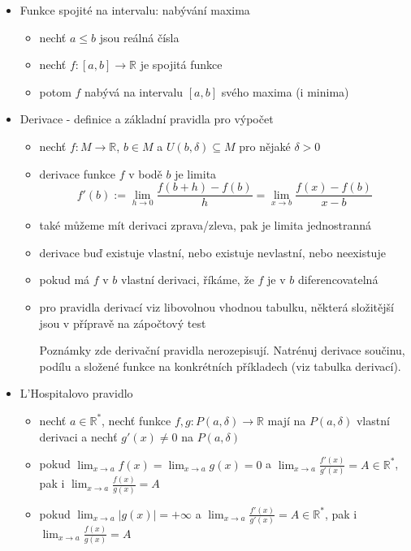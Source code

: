 \begin{itemize}
\begin{itemize}
\item pak každé reálné číslo z intervalu $[m,M]$ je hodnotou funkce $f$ (pro každé $y\in[m,M]$ existuje $x\in[a,b]$ takové, že $f(x)=y$)
\end{itemize}
\item Funkce spojité na intervalu: nabývání maxima
\begin{itemize}
\item nechť $a\leq b$ jsou reálná čísla
\item nechť $f:[a,b]\to\mathbb R$ je spojitá funkce
\item potom $f$ nabývá na intervalu $[a,b]$ svého maxima (i minima)
\end{itemize}
\item Derivace - definice a základní pravidla pro výpočet
\begin{itemize}
\item nechť $f:M\to\mathbb R$, $b\in M$ a $U(b,\delta)\subseteq M$ pro nějaké $\delta\gt 0$
\item derivace funkce $f$ v bodě $b$ je limita \[f'(b):=\lim_{h\to 0}\frac{f(b+h)-f(b)}{h}=\lim_{x\to b}\frac{f(x)-f(b)}{x-b}\]
\item také můžeme mít derivaci zprava/zleva, pak je limita jednostranná
\item derivace buď existuje vlastní, nebo existuje nevlastní, nebo neexistuje
\item pokud má $f$ v $b$ vlastní derivaci, říkáme, že $f$ je v $b$ diferencovatelná
\item pro pravidla derivací viz libovolnou vhodnou tabulku, některá složitější jsou v přípravě na zápočtový test
\begin{practicebox}
Poznámky zde derivační pravidla nerozepisují. Natrénuj derivace součinu, podílu a složené funkce na konkrétních příkladech (viz tabulka derivací).
\end{practicebox}
\end{itemize}
\item L'Hospitalovo pravidlo
\begin{itemize}
\item nechť $a\in\mathbb R^*$, nechť funkce $f,g:P(a,\delta)\to\mathbb R$ mají na $P(a,\delta)$ vlastní derivaci a nechť $g'(x)\neq 0$ na $P(a,\delta)$
\item pokud $\lim_{x\to a}f(x)=\lim_{x\to a}g(x)=0$ a $\lim_{x\to a}\frac{f'(x)}{g'(x)}=A\in\mathbb R^*$, pak i $\lim_{x\to a}\frac{f(x)}{g(x)}=A$
\item pokud $\lim_{x\to a} |g(x)|=+\infty$ a $\lim_{x\to a}\frac{f'(x)}{g'(x)}=A\in\mathbb R^*$, pak i $\lim_{x\to a}\frac{f(x)}{g(x)}=A$

\end{itemize}
\end{itemize}
